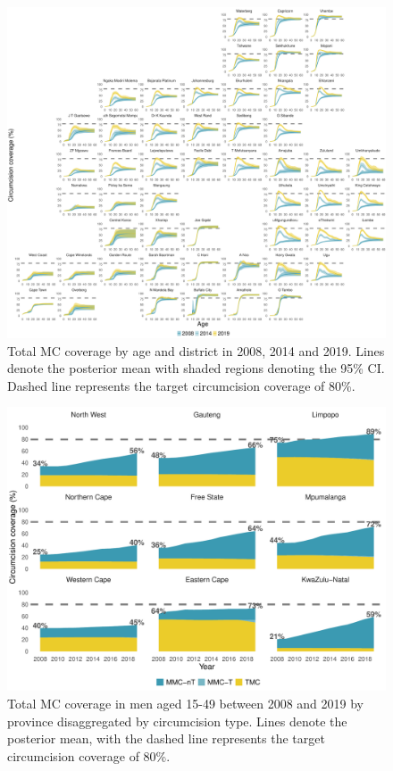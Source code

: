 \documentclass{article}
\begin{document}
\begin{appendix}
\begin{figure}[H]
	\centering
	\includegraphics[width = \linewidth]{Figures/suppmat/Coverage/MCcoverage_SingleAge_District.pdf}
	\caption{Total MC coverage by age and district in 2008, 2014 and 2019. Lines denote the posterior mean with shaded regions denoting the 95\% CI. Dashed line represents the target circumcision coverage of 80\%.}
\end{figure}	


\begin{figure}[H]
	\centering
	\includegraphics[width = \linewidth]{Figures/suppmat/Coverage/Coverage_1549_Province.pdf}
	\caption{Total MC coverage in men aged 15-49 between 2008 and 2019 by province disaggregated by circumcision type. Lines denote the posterior mean, with the dashed line represents the target circumcision coverage of 80\%.}
\end{figure}


\end{appendix}
\end{document}
